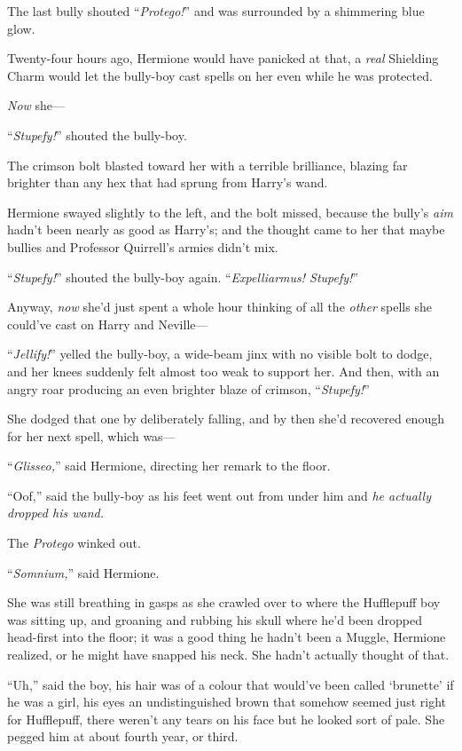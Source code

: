 The last bully shouted “\emph{Protego!}” and was surrounded by a shimmering blue glow.

Twenty-four hours ago, Hermione would have panicked at that, a \emph{real} Shielding Charm would let the bully-boy cast spells on her even while he was protected.

\emph{Now} she—

“\emph{Stupefy!}” shouted the bully-boy.

The crimson bolt blasted toward her with a terrible brilliance, blazing far brighter than any hex that had sprung from Harry’s wand.

Hermione swayed slightly to the left, and the bolt missed, because the bully’s \emph{aim} hadn’t been nearly as good as Harry’s; and the thought came to her that maybe bullies and Professor Quirrell’s armies didn’t mix.

“\emph{Stupefy!}” shouted the bully-boy again. “\emph{Expelliarmus! Stupefy!}”

Anyway, \emph{now} she’d just spent a whole hour thinking of all the \emph{other} spells she could’ve cast on Harry and Neville—

“\emph{Jellify!}” yelled the bully-boy, a wide-beam jinx with no visible bolt to dodge, and her knees suddenly felt almost too weak to support her. And then, with an angry roar producing an even brighter blaze of crimson, “\emph{Stupefy!}”

She dodged that one by deliberately falling, and by then she’d recovered enough for her next spell, which was—

“\emph{Glisseo,}” said Hermione, directing her remark to the floor.

“Oof,” said the bully-boy as his feet went out from under him and \emph{he actually dropped his wand.}

The \emph{Protego} winked out.

“\emph{Somnium,}” said Hermione.

She was still breathing in gasps as she crawled over to where the Hufflepuff boy was sitting up, and groaning and rubbing his skull where he’d been dropped head-first into the floor; it was a good thing he hadn’t been a Muggle, Hermione realized, or he might have snapped his neck. She hadn’t actually thought of that.

“Uh,” said the boy, his hair was of a colour that would’ve been called ‘brunette’ if he was a girl, his eyes an undistinguished brown that somehow seemed just right for Hufflepuff, there weren’t any tears on his face but he looked sort of pale. She pegged him at about fourth year, or third.

